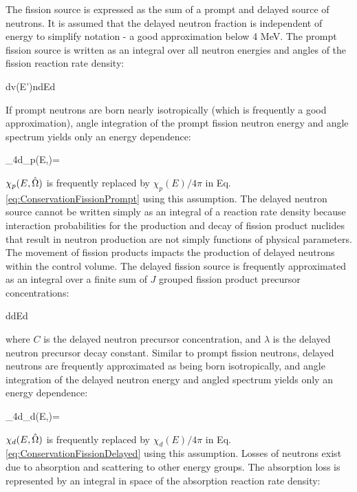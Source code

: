 The fission source is expressed as the sum of a prompt and delayed source of neutrons. It is assumed that the delayed neutron fraction is independent of energy to simplify notation - a good approximation below 4 MeV. The prompt fission source is written as an integral over all neutron energies and angles of the fission reaction rate density:

\beq
\label{eq:ConservationFissionPrompt}
\left\lbrack\int d\volume\promptfissionsource v(E')n\seatelse\right\rbrack dEd\hO
\eeq

If prompt neutrons are born nearly isotropically (which is frequently a good approximation), angle integration of the prompt fission neutron energy and angle spectrum yields only an energy dependence:

\beq
\label{eq:prompt_isotropic}
\int_{4\pi}d\hO \chi_p(E,\hO)=
\eeq

\(\chi_p(E,\hat{\Omega})\) is frequently replaced by \(\chi_p(E)/4\pi\) in Eq. \eqref{eq:ConservationFissionPrompt} using this assumption. The delayed neutron source cannot be written simply as an integral of a reaction rate density because interaction probabilities for the production and decay of fission product nuclides that result in neutron production are not simply functions of physical parameters. The movement of fission products impacts the production of delayed neutrons within the control volume. The delayed fission source is frequently approximated as an integral over a finite sum of \(J\) grouped fission product precursor concentrations:

\beq
\label{eq:ConservationFissionDelayed}
\left\lbrack\int d\volume \delayedfissionsource\right\rbrack dEd\hO  
\eeq

where \(C\) is the delayed neutron precursor concentration, and \(\lambda\) is the delayed neutron precursor decay constant. Similar to prompt fission neutrons, delayed neutrons are frequently approximated as being born isotropically, and angle integration of the delayed neutron energy and angled spectrum yields only an energy dependence:

\beq
\label{eq:delayed_isotropic}
\int_{4\pi}d\hO \chi_d(E,\hO)=
\eeq

\(\chi_d(E,\hat{\Omega})\) is frequently replaced by \(\chi_d(E)/4\pi\) in Eq. \eqref{eq:ConservationFissionDelayed} using this assumption. Losses of neutrons exist due to absorption and scattering to other energy groups. The absorption loss is represented by an integral in space of the absorption reaction rate density:

